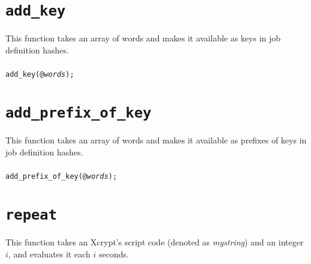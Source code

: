 \documentclass[a4paper,10pt]{report}
\begin{document}


\section{\texttt{add\_key}}

This function takes an array of words and makes it available as keys in job
definition hashes.

\subsubsection{\format}

\begin{boxnote}
\begin{alltt}
add_key(@\textit{words});
\end{alltt}
\end{boxnote}
\vspace{\baselineskip}

\section{\texttt{add\_prefix\_of\_key}}

This function takes an array of words and makes it available as
prefixes of keys in job definition hashes.

\subsubsection{\format}

\begin{boxnote}
\begin{alltt}
add_prefix_of_key(@\textit{words});
\end{alltt}
\end{boxnote}
\vspace{\baselineskip}

\section{\texttt{repeat}}

This function takes an Xcrypt's script code (denoted as
\textit{mystring}) and an integer $i$, and evaluates it each $i$ seconds.
\end{document}
